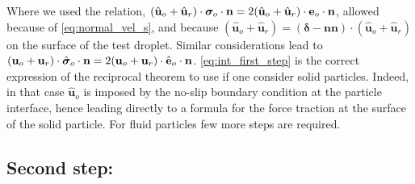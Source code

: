 Where we used the relation, $(\hat{\textbf{u}}_{o} + \hat{\textbf{u}}_r) \cdot  \bm\sigma_{o}\cdot \textbf{n} = 2 (\hat{\textbf{u}}_{o} + \hat{\textbf{u}}_r) \cdot  \textbf e_{o}\cdot \textbf{n}$, allowed because of \ref{eq:normal_vel_s}, and because $(\hat{\textbf{u}}_{o} + \hat{\textbf{u}}_r) = (\bm\delta - \textbf{nn})\cdot (\hat{\textbf{u}}_{o} + \hat{\textbf{u}}_r)$ on the surface of the test droplet. 
Similar considerations lead to $({\textbf{u}}_{o} + {\textbf{u}_r}) \cdot  \hat{\bm\sigma}_{o}\cdot \textbf{n} =2  ({\textbf{u}}_{o} + {\textbf{u}_r}) \cdot  \hat{\textbf e}_{o}\cdot \textbf{n}$. 
\ref{eq:int_first_step} is the correct expression of the reciprocal theorem to use if one consider solid particles.
Indeed, in that case $\hat{\textbf{u}}_{o}$ is imposed by the no-slip boundary condition at the particle interface, hence leading directly to a formula for the force traction at the surface of the solid particle. 
For fluid particles few more steps are required. 

\subsection{Second step:}

